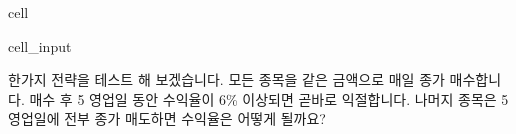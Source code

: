 \documentclass[letterpaper,10pt,english]{jupyterBook}
\begin{document}
\begin{sphinxuseclass}{cell}\begin{sphinxVerbatimInput}

\begin{sphinxuseclass}{cell_input}
\begin{sphinxVerbatim}[commandchars=\\\{\}]
  
\end{sphinxVerbatim}

\end{sphinxuseclass}\end{sphinxVerbatimInput}

\end{sphinxuseclass}
\sphinxAtStartPar
 한가지 전략을 테스트 해 보겠습니다. 모든 종목을 같은 금액으로 매일 종가 매수합니다. 매수 후 5 영업일 동안 수익율이 6\% 이상되면 곧바로 익절합니다. 나머지 종목은 5 영업일에 전부 종가 매도하면 수익율은 어떻게 될까요?
\end{document}
